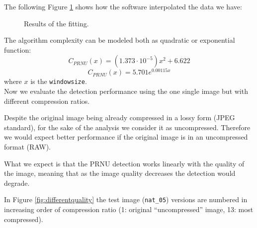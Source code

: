\documentclass[a4paper, 11pt]{article}
\begin{document}
The following Figure \ref{fig:curvefitting} shows how the software interpolated the data we have:
\begin{figure}[H]
	\centering
	\caption{Results of the fitting.}
	\label{fig:curvefitting}
\end{figure}

The algorithm complexity can be modeled both as quadratic or exponential function:
\begin{equation}
C_{PRNU}(x) = \left( 1.373\cdot 10^{-5} \right) x^2 + 6.622
\end{equation}
\begin{equation}
C_{PRNU}(x) = 5.701 e^{0.00115 x}
\end{equation}
where $x$ is the \texttt{windowsize}.\\

Now we evaluate the detection performance using the one single image but with different compression ratios.

Despite the original image being already compressed in a lossy form (JPEG standard), for the sake of the analysis we consider it as uncompressed. Therefore we would expect better performance if the original image is in an uncompressed format (RAW).

What we expect is that the PRNU detection works linearly with the quality of the image, meaning that as the image quality decreases the detection would degrade.

In Figure \ref{fig:differentquality} the test image (\texttt{nat\_05}) versions are numbered in increasing order of compression ratio (1: original ``uncompressed'' image, 13: most compressed). 
\end{document}

